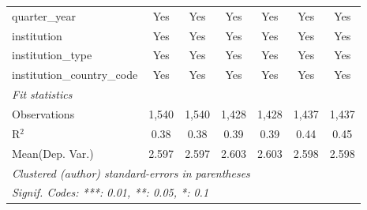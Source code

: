\begin{tabular}{lcccccc}
   quarter\_year                      & Yes     & Yes      & Yes     & Yes     & Yes     & Yes\\  
   institution                        & Yes     & Yes      & Yes     & Yes     & Yes     & Yes\\  
   institution\_type                  & Yes     & Yes      & Yes     & Yes     & Yes     & Yes\\  
   institution\_country\_code         & Yes     & Yes      & Yes     & Yes     & Yes     & Yes\\  
   \midrule
   \emph{Fit statistics}\\
   Observations                       & 1,540   & 1,540    & 1,428   & 1,428   & 1,437   & 1,437\\  
   R$^2$                              & 0.38    & 0.38     & 0.39    & 0.39    & 0.44    & 0.45\\  
Mean(Dep. Var.) & 2.597 & 2.597 & 2.603 & 2.603 & 2.598 & 2.598 \\
   \midrule \midrule
   \multicolumn{7}{l}{\emph{Clustered (author) standard-errors in parentheses}}\\
   \multicolumn{7}{l}{\emph{Signif. Codes: ***: 0.01, **: 0.05, *: 0.1}}\\
\end{tabular}
\par\endgroup
